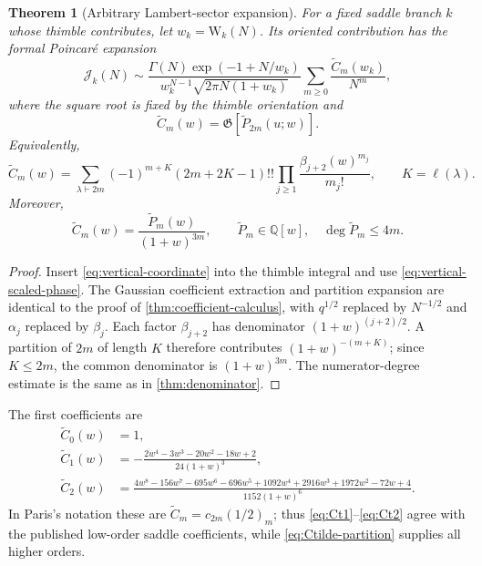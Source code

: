 \documentclass[11pt,a4paper]{article}
\newtheorem{theorem}{Theorem}[section]
\theoremstyle{definition}
\newcommand{\W}{\mathrm W}
\newcommand{\Gaus}{\mathfrak G}
\newcommand{\cJ}{\mathcal J}
\begin{document}
\begin{theorem}[Arbitrary Lambert-sector expansion]\label{thm:sector}
For a fixed saddle branch $k$ whose thimble contributes, let
$w_k=\W_k(N)$.  Its oriented contribution has the formal Poincar\'e expansion
\begin{equation}\label{eq:Jk-expansion}
 \cJ_k(N)\sim
 \frac{\Gamma(N)\exp(-1+N/w_k)}
 {w_k^{N-1}\sqrt{2\pi N(1+w_k)}}
 \sum_{m\ge0}\frac{\widetilde C_m(w_k)}{N^m},
\end{equation}
where the square root is fixed by the thimble orientation and
\begin{equation}\label{eq:Ctilde-gauss}
 \widetilde C_m(w)=\Gaus[\widetilde P_{2m}(u;w)].
\end{equation}
Equivalently,
\begin{equation}\label{eq:Ctilde-partition}
 \boxed{
 \widetilde C_m(w)=
 \sum_{\lambda\vdash2m}
 (-1)^{m+K}(2m+2K-1)!!
 \prod_{j\ge1}
 \frac{\beta_{j+2}(w)^{m_j}}{m_j!},
 \qquad K=\ell(\lambda).}
\end{equation}
Moreover,
\begin{equation}\label{eq:Ctilde-rational}
 \widetilde C_m(w)=
 \frac{\widetilde P_m(w)}{(1+w)^{3m}},
 \qquad
 \widetilde P_m\in\mathbb Q[w],
 \quad \deg\widetilde P_m\le4m.
\end{equation}
\end{theorem}

\begin{proof}
Insert \eqref{eq:vertical-coordinate} into the thimble integral and use
\eqref{eq:vertical-scaled-phase}.  The Gaussian coefficient extraction and
partition expansion are identical to the proof of
\cref{thm:coefficient-calculus}, with $q^{1/2}$ replaced by $N^{-1/2}$ and
$\alpha_j$ replaced by $\beta_j$.  Each factor $\beta_{j+2}$ has denominator
$(1+w)^{(j+2)/2}$.  A partition of $2m$ of length $K$ therefore contributes
$(1+w)^{-(m+K)}$; since $K\le2m$, the common denominator is
$(1+w)^{3m}$.  The numerator-degree estimate is the same as in
\cref{thm:denominator}.
\end{proof}

The first coefficients are
\begin{align}
 \widetilde C_0(w)&=1,\label{eq:Ct0}\\
 \widetilde C_1(w)&=-\frac{2w^4-3w^3-20w^2-18w+2}
 {24(1+w)^3},\label{eq:Ct1}\\
 \widetilde C_2(w)&=\frac{
 4w^8-156w^7-695w^6-696w^5+1092w^4+2916w^3
 +1972w^2-72w+4}
 {1152(1+w)^6}.\label{eq:Ct2}
\end{align}
In Paris's notation these are
$\widetilde C_m=c_{2m}(1/2)_m$; thus
\eqref{eq:Ct1}--\eqref{eq:Ct2} agree with the published low-order saddle
coefficients, while \eqref{eq:Ctilde-partition} supplies all higher orders.
\end{document}
